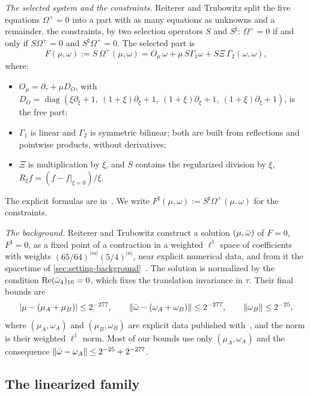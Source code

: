 \emph{The selected system and the constraints.} Reiterer and Trubowitz split the five equations
$\Omega^+=0$ into a part with as many equations as unknowns and a remainder, the constraints, by two
selection operators $S$ and $S^\sharp$: $\Omega^+=0$ if and only if $S\Omega^+=0$ and $S^\sharp\Omega^+=0$.
The selected part is
\begin{equation}\label{eq:F}
  F(\mu,\omega):=S\,\Omega^+(\mu,\omega)
  =O_\mu\,\omega+\mu\,S\Gamma_1\omega+S\Xi\,\Gamma_2(\omega,\omega),
\end{equation}
where:
\begin{itemize}[leftmargin=*]
\item $O_\mu=\partial_\tau+\mu D_O$, with $D_O=\operatorname{diag}(\xi\partial_\xi+1,\
  (1+\xi)\partial_\xi+1,\ (1+\xi)\partial_\xi+1,\ (1+\xi)\partial_\xi+1)$, is the free part;
\item $\Gamma_1$ is linear and $\Gamma_2$ is symmetric bilinear; both are built from reflections and
  pointwise products, without derivatives;
\item $\Xi$ is multiplication by $\xi$, and $S$ contains the regularized division by $\xi$,
  $R_\xi f=(f-f|_{\xi=0})/\xi$.
\end{itemize}
The explicit formulas are in~\cite[\S3]{RT2019}. We write $F^\sharp(\mu,\omega):=S^\sharp\Omega^+(\mu,\omega)$
for the constraints.

\emph{The background.} Reiterer and Trubowitz construct a solution
$(\mu,\bar\omega)$ of $F=0$, $F^\sharp=0$, as a fixed point of a contraction in a weighted $\ell^1$ space
of coefficients with weights $(65/64)^{|m|}(5/4)^{|n|}$, near explicit numerical data, and from it the
spacetime of \cref{sec:setting-background}~\cite[\S\S4--5]{RT2019}. The solution is normalized by the
condition $\operatorname{Re}(\bar\omega_4)_{10}=0$, which fixes the translation invariance in $\tau$. Their final
bounds are
\begin{equation}\label{eq:RTball}
  |\mu-(\mu_A+\mu_B)|\le2^{-277},\qquad \|\bar\omega-(\omega_A+\omega_B)\|\le2^{-277},\qquad
  \|\omega_B\|\le2^{-25},
\end{equation}
where $(\mu_A,\omega_A)$ and $(\mu_B,\omega_B)$ are explicit data published with~\cite{RT2019}, and the
norm is their weighted $\ell^1$ norm. Most of our bounds use only $(\mu_A,\omega_A)$ and the consequence
$\|\bar\omega-\omega_A\|\le2^{-25}+2^{-277}$.

\subsection{The linearized family}\label{sec:setting-linear}

